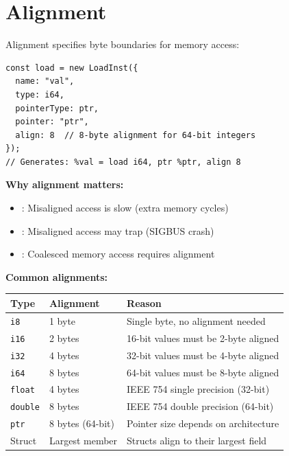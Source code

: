 \section{Alignment}

Alignment specifies byte boundaries for memory access:

\begin{lstlisting}[style=ts]
const load = new LoadInst({
  name: "val",
  type: i64,
  pointerType: ptr,
  pointer: "ptr",
  align: 8  // 8-byte alignment for 64-bit integers
});
// Generates: %val = load i64, ptr %ptr, align 8
\end{lstlisting}

\textbf{Why alignment matters:}
\begin{itemize}[noitemsep]
  \item \textbf{}: Misaligned access is slow (extra memory cycles)
  \item \textbf{}: Misaligned access may trap (SIGBUS crash)
  \item \textbf{}: Coalesced memory access requires alignment
\end{itemize}

\textbf{Common alignments:}
\begin{longtable}{|p{3cm}|p{3cm}|p{7cm}|}
\hline
\textbf{Type} & \textbf{Alignment} & \textbf{Reason} \\
\hline
\texttt{i8} & 1 byte & Single byte, no alignment needed \\
\hline
\texttt{i16} & 2 bytes & 16-bit values must be 2-byte aligned \\
\hline
\texttt{i32} & 4 bytes & 32-bit values must be 4-byte aligned \\
\hline
\texttt{i64} & 8 bytes & 64-bit values must be 8-byte aligned \\
\hline
\texttt{float} & 4 bytes & IEEE 754 single precision (32-bit) \\
\hline
\texttt{double} & 8 bytes & IEEE 754 double precision (64-bit) \\
\hline
\texttt{ptr} & 8 bytes (64-bit) & Pointer size depends on architecture \\
\hline
Struct & Largest member & Structs align to their largest field \\
\hline
\end{longtable}

